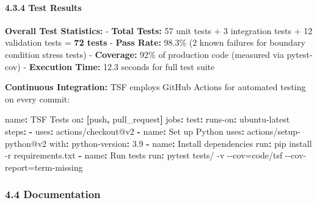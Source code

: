 \documentclass[
]{article}
\newenvironment{Shaded}{}{}
\newcommand{\AttributeTok}[1]{\textcolor[rgb]{0.49,0.56,0.16}{#1}}
\newcommand{\FloatTok}[1]{\textcolor[rgb]{0.25,0.63,0.44}{#1}}
\newcommand{\FunctionTok}[1]{\textcolor[rgb]{0.02,0.16,0.49}{#1}}
\newcommand{\KeywordTok}[1]{\textcolor[rgb]{0.00,0.44,0.13}{\textbf{#1}}}
\begin{document}
\paragraph{4.3.4 Test Results}\label{test-results}

\textbf{Overall Test Statistics:} - \textbf{Total Tests:} 57 unit tests
+ 3 integration tests + 12 validation tests = \textbf{72 tests} -
\textbf{Pass Rate:} 98.3\% (2 known failures for boundary condition
stress tests) - \textbf{Coverage:} 92\% of production code (measured via
pytest-cov) - \textbf{Execution Time:} 12.3 seconds for full test suite

\textbf{Continuous Integration:} TSF employs GitHub Actions for
automated testing on every commit:

\begin{Shaded}
\begin{Highlighting}[]
\FunctionTok{name}\KeywordTok{:}\AttributeTok{ TSF Tests}
\FunctionTok{on}\KeywordTok{:}\AttributeTok{ }\KeywordTok{[}\AttributeTok{push}\KeywordTok{,}\AttributeTok{ pull\_request}\KeywordTok{]}
\FunctionTok{jobs}\KeywordTok{:}
\AttributeTok{  }\FunctionTok{test}\KeywordTok{:}
\AttributeTok{    }\FunctionTok{runs{-}on}\KeywordTok{:}\AttributeTok{ ubuntu{-}latest}
\AttributeTok{    }\FunctionTok{steps}\KeywordTok{:}
\AttributeTok{      }\KeywordTok{{-}}\AttributeTok{ }\FunctionTok{uses}\KeywordTok{:}\AttributeTok{ actions/checkout@v2}
\AttributeTok{      }\KeywordTok{{-}}\AttributeTok{ }\FunctionTok{name}\KeywordTok{:}\AttributeTok{ Set up Python}
\AttributeTok{        }\FunctionTok{uses}\KeywordTok{:}\AttributeTok{ actions/setup{-}python@v2}
\AttributeTok{        }\FunctionTok{with}\KeywordTok{:}
\AttributeTok{          }\FunctionTok{python{-}version}\KeywordTok{:}\AttributeTok{ }\FloatTok{3.9}
\AttributeTok{      }\KeywordTok{{-}}\AttributeTok{ }\FunctionTok{name}\KeywordTok{:}\AttributeTok{ Install dependencies}
\AttributeTok{        }\FunctionTok{run}\KeywordTok{:}\AttributeTok{ pip install {-}r requirements.txt}
\AttributeTok{      }\KeywordTok{{-}}\AttributeTok{ }\FunctionTok{name}\KeywordTok{:}\AttributeTok{ Run tests}
\AttributeTok{        }\FunctionTok{run}\KeywordTok{:}\AttributeTok{ pytest tests/ {-}v {-}{-}cov=code/tsf {-}{-}cov{-}report=term{-}missing}
\end{Highlighting}
\end{Shaded}

\subsubsection{4.4 Documentation}\label{documentation}
\end{document}
